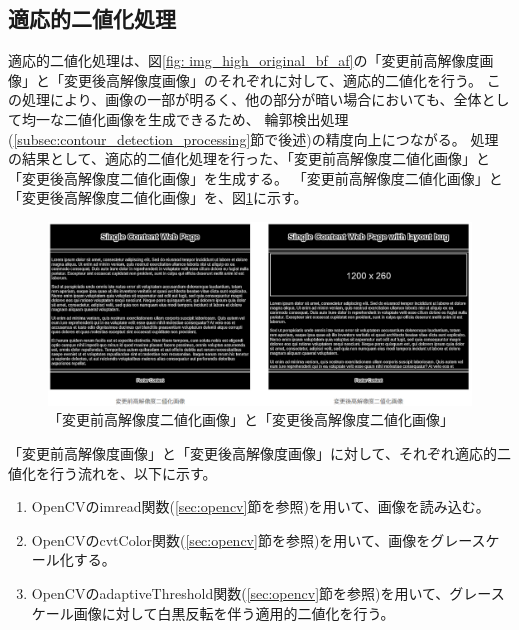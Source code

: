 \subsection{適応的二値化処理}\label{subsec:Adaptive_Binarisation}
適応的二値化処理は、図\ref{fig: img_high_original_bf_af}の「変更前高解像度画像」と「変更後高解像度画像」のそれぞれに対して、適応的二値化を行う。
この処理により、画像の一部が明るく、他の部分が暗い場合においても、全体として均一な二値化画像を生成できるため、
輪郭検出処理(\ref{subsec:contour_detection_processing}節で後述)の精度向上につながる。
処理の結果として、適応的二値化処理を行った、「変更前高解像度二値化画像」と「変更後高解像度二値化画像」を生成する。
「変更前高解像度二値化画像」と「変更後高解像度二値化画像」を、図\ref{fig: img_high_bin_bf_af}に示す。
\begin{figure}[tp]
    \begin{center}
        \includegraphics[width=1.0\columnwidth]{image/4_img_high_bin_bf_af.png}
        \caption{「変更前高解像度二値化画像」と「変更後高解像度二値化画像」}
        \label{fig: img_high_bin_bf_af}
    \end{center}
\end{figure}
\par
「変更前高解像度画像」と「変更後高解像度画像」に対して、それぞれ適応的二値化を行う流れを、以下に示す。
\begin{enumerate}
    \item OpenCVのimread関数(\ref{sec:opencv}節を参照)を用いて、画像を読み込む。
    \item OpenCVのcvtColor関数(\ref{sec:opencv}節を参照)を用いて、画像をグレースケール化する。
    \item OpenCVのadaptiveThreshold関数(\ref{sec:opencv}節を参照)を用いて、グレースケール画像に対して白黒反転を伴う適用的二値化を行う。
\end{enumerate}

